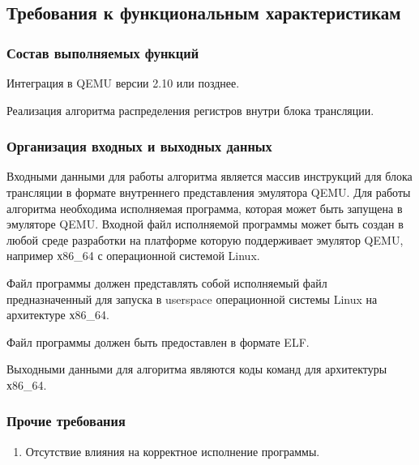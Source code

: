 

\subsection{Требования к функциональным характеристикам}
\subsubsection{Состав выполняемых функций}
\begin{my_enumerate}
\item Интеграция в QEMU версии 2.10 или позднее.
\item Реализация алгоритма распределения регистров внутри блока трансляции.
\end{my_enumerate}

\subsubsection{Организация входных и выходных данных}
Входными данными для работы алгоритма является массив инструкций для блока трансляции в формате внутреннего представления эмулятора QEMU. Для работы алгоритма необходима исполняемая программа, которая может быть запущена в эмуляторе QEMU. Входной файл исполняемой программы может быть создан в любой среде разработки на платформе которую поддерживает эмулятор QEMU, например х86\_64 с операционной системой Linux.

\begin{my_enumerate}
\item Файл программы должен представлять собой исполняемый файл предназначенный для запуска в userspace операционной системы Linux на архитектуре х86\_64.
\item Файл программы должен быть предоставлен в формате ELF.
\end{my_enumerate}

\medskip
Выходными данными для алгоритма являются коды команд для архитектуры х86\_64.

\subsubsection{Прочие требования}
\begin{enumerate}
\item Отсутствие влияния на корректное исполнение программы.
\end{enumerate}


